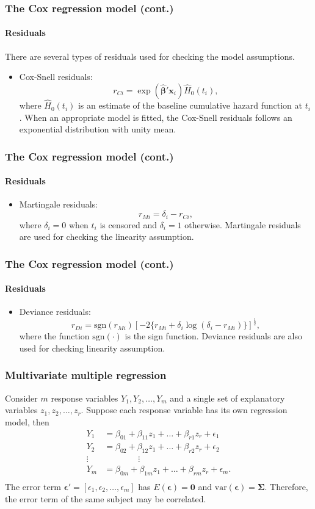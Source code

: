 \documentclass{beamer}
\begin{document}
	\begin{frame}
		\frametitle{The Cox regression model (cont.)}
		\framesubtitle{Residuals}
		There are several types of residuals used for checking the model assumptions.
		\begin{itemize}
			\item Cox-Snell residuals:
			\[ r_{ Ci } = \exp( \hat{ \pmb{ \beta } }'\pmb{ x }_i ) \hat{ H }_0( t_i ), \]
			where $\hat{ H }_0( t_i )$ is an estimate of the baseline cumulative hazard function at $t_i$. When an appropriate model is fitted, the Cox-Snell residuals follows an exponential distribution with unity mean.
		\end{itemize}
	\end{frame}

	\begin{frame}
		\frametitle{The Cox regression model (cont.)}
		\framesubtitle{Residuals}
		\begin{itemize}
			\item Martingale residuals:
			\[ r_{ Mi } = \delta_i - r_{ Ci }, \]
			where $\delta_i = 0$ when $t_i$ is censored and $\delta_i = 1$ otherwise. Martingale residuals are used for checking the linearity assumption.
		\end{itemize}
	\end{frame}

	\begin{frame}
		\frametitle{The Cox regression model (cont.)}
		\framesubtitle{Residuals}
		\begin{itemize}
			\item Deviance residuals:
			\[ r_{ Di } = \text{sgn}( r_{ Mi } )[ -2 \{ r_{ Mi } + \delta_i \log( \delta_i - r_{ Mi } ) \} ] ^ \frac{ 1 }{ 2 }, \]
			where the function $\text{sgn}( \cdot )$ is the sign function. Deviance residuals are also used for checking linearity assumption.
		\end{itemize}
	\end{frame}
	
	\begin{frame}
		\frametitle{Multivariate multiple regression}
		Consider $m$ response variables $Y_1, Y_2, \dots, Y_m$ and a single set of explanatory variables $z_1, z_2, \dots, z_r$. Suppose each response variable has its own regression model, then 
		\begin{align*}
			Y_1 & = \beta_{ 01 } + \beta_{ 11 } z_{ 1 } + \dots + \beta_{ r1 } z_r + \epsilon_1 \\
			Y_2 & = \beta_{ 02 } + \beta_{ 12 } z_{ 1 } + \dots + \beta_{ r2 } z_r + \epsilon_2 \\
			\vdots & \qquad \qquad \vdots \\
			Y_m & = \beta_{ 0m } + \beta_{ 1m } z_{ 1 } + \dots + \beta_{ rm } z_r + \epsilon_m. \\
		\end{align*}
		The error term $\pmb{ \epsilon }' = [ \epsilon_1, \epsilon_2, \dots, \epsilon_m ]$ has $E( \pmb{ \epsilon } ) = \pmb{ 0 }$ and $\text{var}( \pmb{ \epsilon } ) = \pmb{ \Sigma }$. Therefore, the error term of the same subject may be correlated.
	\end{frame}
	
\end{document}
